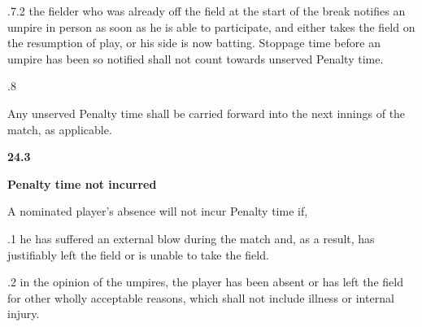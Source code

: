 \documentclass[12pt]{article}
\begin{document}
\vspace{\baselineskip}
\begin{adjustwidth}{1.18in}{0.04in}
{\fontsize{9pt}{10.8pt}.7.2 \tabto{1.17in} the fielder who was already off the field at the start of the break notifies an umpire in person as soon as he is able to participate, and either takes the field on the resumption of play, or his side is now batting. Stoppage time before an umpire has been so notified shall not count towards unserved Penalty time.\par}\par

\end{adjustwidth}


\vspace{\baselineskip}
{\fontsize{9pt}{10.8pt}.8 \tabto{0.49in} {\fontsize{8pt}{9.6pt}\selectfont Any unserved Penalty time shall be carried forward into the next innings of the match, as applicable.\par}\par}\par


\vspace{\baselineskip}
{\fontsize{11pt}{13.2pt}\selectfont \textbf{24.3 \tabto{0.47in} }{\fontsize{10pt}{12.0pt}\selectfont \textbf{Penalty time not incurred}\par}\par}\par


\vspace{\baselineskip}
{\fontsize{9pt}{10.8pt}\selectfont A nominated player’s absence will not incur Penalty time if,\par}\par


\vspace{\baselineskip}
\begin{adjustwidth}{0.5in}{0.03in}
{\fontsize{9pt}{10.8pt}.1 \tabto{0.49in} he has suffered an external blow during the match and, as a result, has justifiably left the field or is unable to take the field.\par}\par

\end{adjustwidth}


\vspace{\baselineskip}
\begin{adjustwidth}{0.5in}{0.28in}
{\fontsize{9pt}{10.8pt}.2 \tabto{0.49in} in the opinion of the umpires, the player has been absent or has left the field for other wholly acceptable reasons, which shall not include illness or internal injury.\par}\par

\end{adjustwidth}
\end{document}
